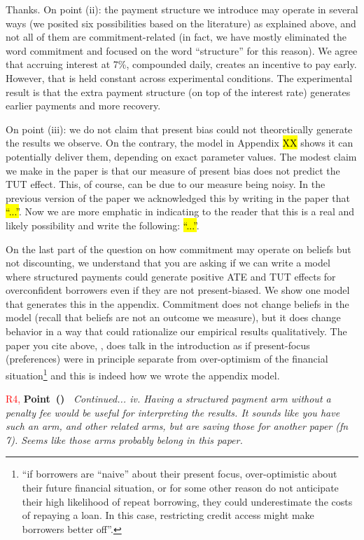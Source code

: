 \documentclass[11pt, colorinlistoftodos]{article} %
\newcounter{point}
\def\thepoint{\alph{point}}
\newenvironment{point}{\refstepcounter{point}\noindent\textbf{Point~(\thepoint)~}\hrulefill\newline\itshape\small}{\par\vspace{-1.25em}\noindent\hrulefill}
\begin{document}
Thanks. On point (ii): the payment structure we introduce may operate in several ways (we posited six possibilities based on the literature) as explained above, and not all of them are commitment-related (in fact, we have mostly eliminated the word commitment and focused on the word ``structure'' for this reason). We agree that accruing interest at 7\%, compounded daily, creates an incentive to pay early. However, that is held constant across experimental conditions.  The experimental result is that the extra payment structure (on top of the interest rate) generates earlier payments and more recovery. 

On point (iii): we do not claim that present bias could not theoretically generate the results we observe. On the contrary, the model in Appendix \hl{XX} shows it can potentially deliver them, depending on exact parameter values. The modest claim we make in the paper is that our measure of present bias does not predict the TUT effect. This, of course, can be due to our measure being noisy. In the previous version of the paper we acknowledged this by writing in the paper that \hl{``...''}. Now we are more emphatic in indicating to the reader that this is a real and likely possibility and write the following: \hl{``...''}.

On the last part of the question on how commitment may operate on beliefs but not discounting, we understand that you are asking if we can write a model where structured payments could generate positive ATE and TUT effects for overconfident borrowers even if they are not present-biased. We show one model that generates this in the appendix. Commitment does not change beliefs in the model (recall that beliefs are not an outcome we measure), but it does change behavior in a way that could rationalize our empirical results qualitatively. The paper you cite above, \cite{predatory2022}, does talk in the introduction as if present-focus (preferences) were in principle separate from over-optimism of the financial situation\footnote{``if borrowers are “naive” about their present focus, over-optimistic about their future financial situation, or for some other reason do not anticipate their high likelihood of repeat borrowing, they could underestimate the costs of repaying a loan. In this case, restricting credit access might make borrowers better off''.} and this is indeed how we wrote the appendix model.


\setcounter{point}{0}
\vspace{.2in}
\textcolor{red}{R4, }\begin{point} 
Continued...
iv. Having a structured payment arm without a penalty fee would be useful
for interpreting the results. It sounds like you have such an arm, and
other related arms, but are saving those for another paper (fn 7). Seems
like those arms probably belong in this paper.
\end{point}
\end{document}
